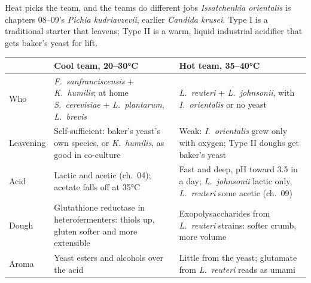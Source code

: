 \documentclass[aspectratio=169,11pt]{beamer}
\begin{document}
\begin{frame}{Heat picks the team, and the teams do different jobs}
  \scriptsize
  \textit{Issatchenkia orientalis} is chapters 08--09's \textit{Pichia kudriavzevii}, earlier \textit{Candida krusei}. Type I is a traditional starter that leavens; Type II is a warm, liquid industrial acidifier that gets baker's yeast for lift.
  \renewcommand{\arraystretch}{0.88}
  \begin{tabularx}{\linewidth}{@{}>{\raggedright\arraybackslash}p{1.3cm} >{\raggedright\arraybackslash}X >{\raggedright\arraybackslash}X@{}}
    \toprule
    & \textbf{Cool team, 20--30°C} & \textbf{Hot team, 35--40°C} \\
    \midrule
    Who & \textit{F.\ sanfranciscensis} + \textit{K.\ humilis}; at home \textit{S.\ cerevisiae} + \textit{L.\ plantarum}, \textit{L.\ brevis} & \textit{L.\ reuteri} + \textit{L.\ johnsonii}, with \textit{I.\ orientalis} or no yeast \\
    Leavening & Self-sufficient: baker's yeast's own species, or \textit{K.\ humilis}, as good in co-culture & Weak: \textit{I.\ orientalis} grew only with oxygen; Type II doughs get baker's yeast \\
    Acid & Lactic and acetic (ch.\ 04); acetate falls off at 35°C & Fast and deep, pH toward 3.5 in a day; \textit{L.\ johnsonii} lactic only, \textit{L.\ reuteri} some acetic (ch.\ 09) \\
    Dough & Glutathione reductase in heterofermenters: thiols up, gluten softer and more extensible & Exopolysaccharides from \textit{L.\ reuteri} strains: softer crumb, more volume \\
    Aroma & Yeast esters and alcohols over the acid & Little from the yeast; glutamate from \textit{L.\ reuteri} reads as umami \\
    \bottomrule
  \end{tabularx}
\end{frame}
\end{document}
